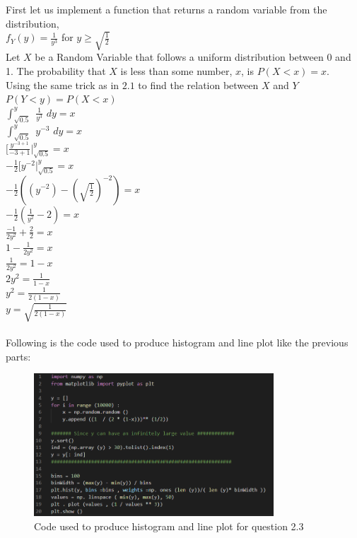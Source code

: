 \documentclass[answers]{exam}
\begin{document}
\begin{framed}
First let us implement a function that returns a random variable from the distribution,\\
    $f_Y(y) = \frac{1}{y^3}$ for $y \geq \sqrt{\frac{1}{2}}$ \\
Let $X$ be a Random Variable that follows a uniform distribution between 0 and 1. The probability that $X$ is less than some
number, $x$, is $P(X < x) = x$. \\
Using the same trick as in $2.1$ to find the relation between $X$ and $Y$ \\
$P(Y < y) = P(X < x)$\\
$\int^y_{\sqrt{0.5}} \, \, \frac{1}{y^3} \, \, dy = x$\\
$\int^y_{\sqrt{0.5}} \, \, y^{-3} \, \, dy = x$\\
$\Bigr[ \frac{y^{-3+1}}{-3+1} \Bigr|^y_{\sqrt{0.5}} = x$\\
$-\frac{1}{2} \Bigr[ y^{-2} \Bigr|^y_{\sqrt{0.5}} = x$\\
$-\frac{1}{2} ((y^{-2}) - (\sqrt{\frac{1}{2}})^{-2}) = x$\\
$-\frac{1}{2} (\frac{1}{y^2} - 2) = x$\\
$\frac{-1}{2y^2} + \frac{2}{2} = x$\\
$1 - \frac{1}{2y^2} = x$\\
$\frac{1}{2y^2} = 1 - x$\\
$2y^2 = \frac{1}{1-x}$\\
$y^2 = \frac{1}{2(1-x)}$\\
$y = \sqrt{\frac{1}{2(1-x)}}$\\\\

Following is the code used to produce histogram and line plot like the previous parts:\\

\begin{figure}[H] %
    \centering
    \includegraphics[width= 0.8\textwidth]{Q2.3_code.PNG}
    \caption{Code used to produce histogram and line plot for question 2.3}
\end{figure}


\end{framed}
\end{document}
